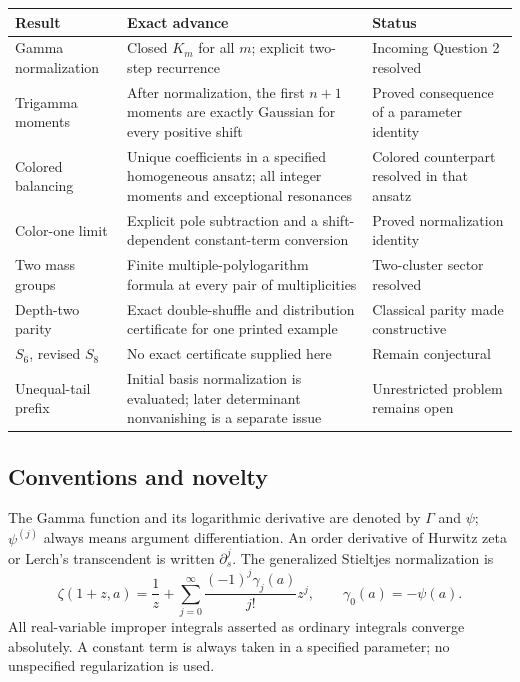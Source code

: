 \begin{longtable}{@{}>{\raggedright\arraybackslash}p{}>{\raggedright\arraybackslash}p{}>{\raggedright\arraybackslash}p{}@{}}
\toprule
Result & Exact advance & Status\\
\midrule
\endhead
Gamma normalization &
Closed $K_m$ for all $m$; explicit two-step recurrence &
Incoming Question 2 resolved\\[3pt]
Trigamma moments &
After normalization, the first $n+1$ moments are exactly Gaussian
for every positive shift &
Proved consequence of a parameter identity\\[3pt]
Colored balancing &
Unique coefficients in a specified homogeneous ansatz; all integer
moments and exceptional resonances &
Colored counterpart resolved in that ansatz\\[3pt]
Color-one limit &
Explicit pole subtraction and a shift-dependent constant-term
conversion &
Proved normalization identity\\[3pt]
Two mass groups &
Finite multiple-polylogarithm formula at every pair of multiplicities &
Two-cluster sector resolved\\[3pt]
Depth-two parity &
Exact double-shuffle and distribution certificate for one
printed example &
Classical parity made constructive\\[3pt]
$S_6$, revised $S_8$ &
No exact certificate supplied here &
Remain conjectural\\[3pt]
Unequal-tail prefix &
Initial basis normalization is evaluated; later determinant
nonvanishing is a separate issue &
Unrestricted problem remains open\\
\bottomrule
\end{longtable}

\subsection{Conventions and novelty}

The Gamma function and its logarithmic derivative are denoted by
$\Gamma$ and $\psi$; $\psi^{(j)}$ always means argument differentiation.
An order derivative of Hurwitz zeta or Lerch's transcendent is written
$\partial_s^j$. The generalized Stieltjes normalization is
\begin{equation}\label{eq:stieltjes-convention}
 \zeta(1+z,a)=\frac1z+
  \sum_{j=0}^{\infty}\frac{(-1)^j\gamma_j(a)}{j!}z^j,
 \qquad \gamma_0(a)=-\psi(a).
\end{equation}
All real-variable improper integrals asserted as ordinary integrals
converge absolutely. A constant term is always taken in a specified
parameter; no unspecified regularization is used.

